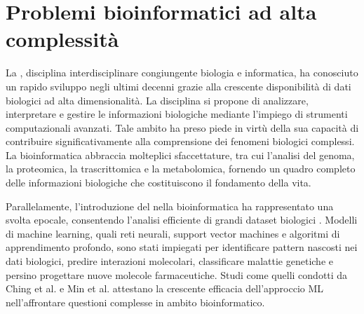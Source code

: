 % 
% 
% 



\clearpage
\cleardoublepage

\chapter{Problemi bioinformatici ad alta complessità}

La , disciplina interdisciplinare congiungente biologia e informatica, ha conosciuto un rapido sviluppo negli ultimi decenni grazie alla crescente disponibilità di dati biologici ad alta dimensionalità. La disciplina si propone di analizzare, interpretare e gestire le informazioni biologiche mediante l'impiego di strumenti computazionali avanzati. Tale ambito ha preso piede in virtù della sua capacità di contribuire significativamente alla comprensione dei fenomeni biologici complessi. La bioinformatica abbraccia molteplici sfaccettature, tra cui l'analisi del genoma, la proteomica, la trascrittomica e la metabolomica, fornendo un quadro completo delle informazioni biologiche che costituiscono il fondamento della vita.

Parallelamente, l'introduzione del  nella bioinformatica ha rappresentato una svolta epocale, consentendo l'analisi efficiente di grandi dataset biologici \cite{lecun2015deep, angermueller2016deep}. Modelli di machine learning, quali reti neurali, support vector machines e algoritmi di apprendimento profondo, sono stati impiegati per identificare pattern nascosti nei dati biologici, predire interazioni molecolari, classificare malattie genetiche e persino progettare nuove molecole farmaceutiche. Studi come quelli condotti da Ching et al. \cite{ching2018deep} e Min et al. \cite{min2017deep} attestano la crescente efficacia dell'approccio ML nell'affrontare questioni complesse in ambito bioinformatico.

